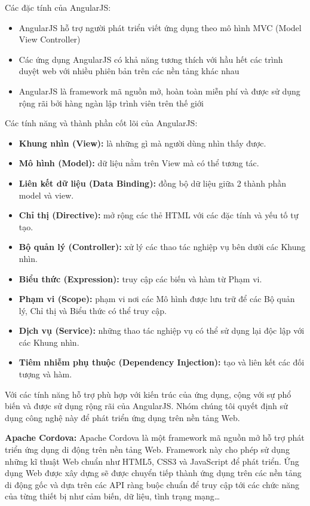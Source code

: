 \documentclass[11pt,a4paper,oneside]{book}
\begin{document}
Các đặc tính của AngularJS:
\begin{itemize}[topsep=1mm,itemsep=-0.5mm]
\item AngularJS hỗ trợ người phát triển viết ứng dụng theo mô hình MVC (Model View Controller)
\item Các ứng dụng AngularJS có khả năng tương thích với hầu hết các trình duyệt web với nhiều phiên bản trên các nền tảng khác nhau
\item AngularJS là framework mã nguồn mở, hoàn toàn miễn phí và được sử dụng rộng rãi bởi hàng ngàn lập trình viên trên thế giới
\vspace{1mm}
\end{itemize}

Các tính năng và thành phần cốt lõi của AngularJS:

\begin{itemize}[topsep=1mm,itemsep=-0.5mm]
\item \textbf{Khung nhìn (View):} là những gì mà người dùng nhìn thấy được.
\item \textbf{Mô hình (Model):} dữ liệu nằm trên View mà có thể tương tác.
\item \textbf{Liên kết dữ liệu (Data Binding):} đồng bộ dữ liệu giữa 2 thành phần model và view.
\item \textbf{Chỉ thị (Directive):} mở rộng các thẻ HTML với các đặc tính và yếu tố tự tạo.
\item \textbf{Bộ quản lý (Controller):} xử lý các thao tác nghiệp vụ bên dưới các Khung nhìn.
\item \textbf{Biểu thức (Expression):} truy cập các biến và hàm từ Phạm vi.
\item \textbf{Phạm vi (Scope):} phạm vi nơi các Mô hình được lưu trữ để các Bộ quản lý, Chỉ thị và Biểu thức có thể truy cập.
\item \textbf{Dịch vụ (Service):} những thao tác nghiệp vụ có thể sử dụng lại độc lập với các Khung nhìn.
\item \textbf{Tiêm nhiễm phụ thuộc (Dependency Injection):} tạo và liên kết các đối tượng và hàm.
\vspace{1mm}
\end{itemize}

Với các tính năng hỗ trợ phù hợp với kiến trúc của ứng dụng, cộng với sự phổ biến và được sử dụng rộng rãi của AngularJS. Nhóm chúng tôi quyết định sử dụng công nghệ này để phát triển ứng dụng trên nền tảng Web.

\textbf{Apache Cordova:} Apache Cordova là một framework mã nguồn mở hỗ trợ phát triển ứng dụng di động trên nền tảng Web. Framework này cho phép sử dụng những kĩ thuật Web chuẩn như HTML5, CSS3 và JavaScript để phát triển. Ứng dụng Web được xây dựng sẽ được chuyển tiếp thành ứng dụng trên các nền tảng di động gốc và dựa trên các API ràng buộc chuẩn để truy cập tới các chức năng của từng thiết bị như cảm biến, dữ liệu, tình trạng mạng…
\end{document}
